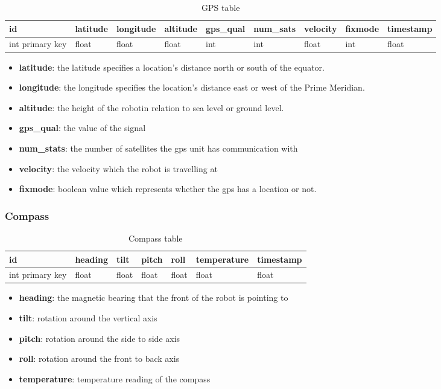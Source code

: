\begin{table}[!htb]
\centering
\caption{GPS table}
\label{tab:db-gps}
\begin{tabular}{@{}lllllllll@{}}
\toprule
id              & latitude & longitude & altitude & gps\_qual & num\_sats & velocity & fixmode & timestamp \\ \midrule
int primary key & float    & float     & float    & int       & int       & float    & int     & float
\end{tabular}
\end{table}
\begin{itemize}
\item{\textbf{latitude}}: the latitude specifies a location's distance north or south of the equator.
\item{\textbf{longitude}}: the longitude specifies the location's distance east or west of the Prime Meridian.
\item{\textbf{altitude}}: the height of the robotin relation to sea level or ground level.
\item{\textbf{gps\_qual}}: the value of the signal
\item{\textbf{num\_stats}}: the number of satellites the gps unit has communication with
\item{\textbf{velocity}}: the velocity which the robot is travelling at
\item{\textbf{fixmode}}: boolean value which represents whether the gps has a location or not.  
\end{itemize}


\subsubsection{Compass}
\begin{table}[!htb]
\centering
\caption{Compass table}
\label{tab:db-compass}
\begin{tabular}{@{}lllllll@{}}
\toprule
id              & heading & tilt  & pitch & roll  & temperature & timestamp \\ \midrule
int primary key & float   & float & float & float & float       & float
\end{tabular}
\end{table}
\begin{itemize}
\item{\textbf{heading}}: the magnetic bearing that the front of the robot is pointing to
\item{\textbf{tilt}}: rotation around the vertical axis
\item{\textbf{pitch}}: rotation around the side to side axis
\item{\textbf{roll}}: rotation around the front to back axis
\item{\textbf{temperature}}: temperature reading of the compass
\end{itemize}


